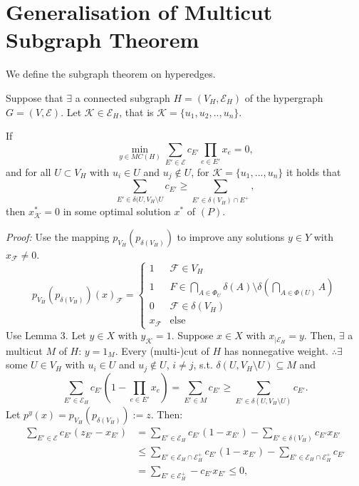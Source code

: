 \section{Generalisation of Multicut Subgraph Theorem}
We define the subgraph theorem on hyperedges. 

\begin{theorem}
Suppose that $\exists$ a connected subgraph $H=(V_H,\mathcal{E}_H)$ of the hypergraph $G=(V, \mathcal{E})$. Let $\mathcal{K} \in \mathcal{E}_H$, that is $\mathcal{K}=\{u_1, u_2, .., u_n\}$. 

If \[ \min_{y \in MC(H)} \sum_{E' \in \mathcal{E}} c_{E'} \prod_{e \in E'} x_e =0,\] and for all $U \subset V_H$ with $u_i \in U$ and $u_j \notin U$, for $\mathcal{K}=\{u_1, ..., u_n\}$ it holds that 
\[ \sum_{E' \in \delta(U, V_H \setminus U} c_{E'} \geq \sum_{E' \in \delta(V_H) \cap E^+}, \] then $x^*_{\mathcal{K}}=0$ in some optimal solution $x^*$ of $(P)$. 
\end{theorem}
\textit{Proof:} Use the mapping $p_{V_H} (p_{\delta(V_H)})$ to improve any solutions $y \in Y$ with $x_{\mathcal{F}} \neq 0$.  
\begin{equation}
    p_{V_H} (p_{\delta(V_H)})(x)_{\mathcal{F}}= \begin{cases}
    1 & \mathcal{F} \in V_H \\
    1 & F \in \bigcap_{A \in \Phi_U} \delta(A) \setminus \delta( \bigcap_{A \in \Phi(U)} A) \\
    0 & \mathcal{F} \in \delta(V_H) \\
    x_{\mathcal{F}} & \text{else} 
    \end{cases}
\end{equation}
Use Lemma 3. Let $y \in X$ with $y_{\mathcal{K}}=1$. Suppose $x \in X$ with $x_{|\mathcal{E}_H}=y$. Then, $\exists$ a multicut $M$ of $H$: $y=1_M$. Every (multi-)cut of $H$ has nonnegative weight. $\therefore \exists$ some $U \in V_H$ with $u_i \in U$ and $u_j \notin U$, $i \neq j$, s.t. $\delta(U, V_H \setminus U) \subseteq M$ and \[ \sum_{E' \in \mathcal{E}_H} c_{E'} (1-\prod_{e \in E'} x_e) = \sum_{E' \in M} c_{E'} \geq \sum_{E' \in \delta(U, V_H \setminus U)} c_{E'}. \] Let $p^y(x)= p_{V_H} (p_{\delta(V_H)}) := z$. Then: 
\begin{align}
    \sum_{E' \in \mathcal{E}} c_{E'} (z_{E'} - x_{E'}) & =  \sum_{E' \in \mathcal{E}_H} c_{E'} (1-x_{E'}) - \sum_{E' \in \delta(V_H)} c_{E'} x_{E'} \\ & \leq \sum_{E' \in \mathcal{E}_H \cap \mathcal{E}^+_H} c_{E'} (1-x_{E'}) - \sum_{E' \in \mathcal{E}_H \cap \mathcal{E}^+_H } c_{E'} \\
    & = \sum_{E' \in \mathcal{E}^+_H} -c_{E'} x_{E'} \leq 0,
\end{align}

